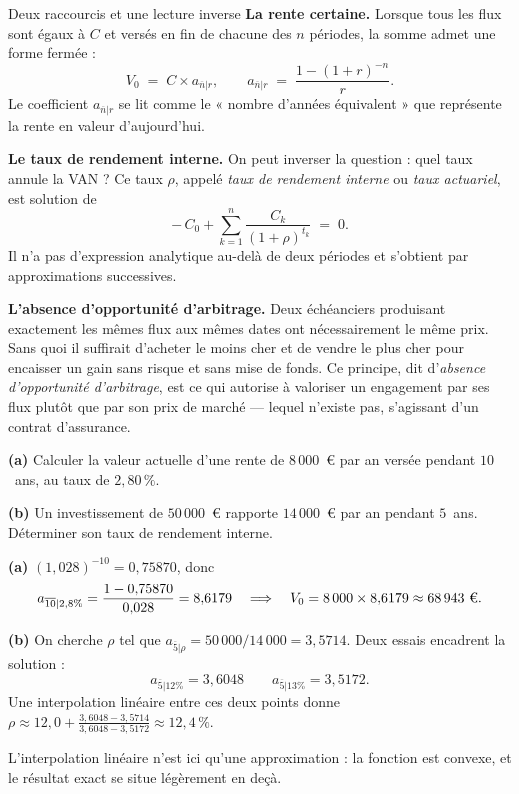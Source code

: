 \begin{generalisation}{Deux raccourcis et une lecture inverse}
\textbf{La rente certaine.} Lorsque tous les flux sont égaux à $C$ et versés en
fin de chacune des $n$ périodes, la somme admet une forme fermée :
\[
  V_0 \;=\; C \times a_{\overline{n}|r},
  \qquad
  a_{\overline{n}|r} \;=\; \frac{1-(1+r)^{-n}}{r}.
\]
Le coefficient $a_{\overline{n}|r}$ se lit comme le « nombre
d'années équivalent » que représente la rente en valeur d'aujourd'hui.

\medskip
\textbf{Le taux de rendement interne.} On peut inverser la question : quel taux
annule la VAN ? Ce taux $\rho$, appelé \emph{taux de rendement interne} ou
\emph{taux actuariel}, est solution de
\[
  -\,C_0 + \sum_{k=1}^{n} \frac{C_k}{(1+\rho)^{t_k}} \;=\; 0 .
\]
Il n'a pas d'expression analytique au-delà de deux périodes et s'obtient par
approximations successives.

\medskip
\textbf{L'absence d'opportunité d'arbitrage.} Deux échéanciers produisant
exactement les mêmes flux aux mêmes dates ont nécessairement le même prix. Sans
quoi il suffirait d'acheter le moins cher et de vendre le plus cher pour
encaisser un gain sans risque et sans mise de fonds. Ce principe, dit
d'\emph{absence d'opportunité d'arbitrage},
est ce qui autorise à valoriser un engagement par ses flux plutôt que par son
prix de marché --- lequel n'existe pas, s'agissant d'un contrat d'assurance.
\end{generalisation}

\begin{exercice}
\textbf{(a)} Calculer la valeur actuelle d'une rente de $8\,000$~\euro{} par an
versée pendant $10$~ans, au taux de $2{,}80\,\%$.

\medskip
\textbf{(b)} Un investissement de $50\,000$~\euro{} rapporte $14\,000$~\euro{}
par an pendant $5$~ans. Déterminer son taux de rendement interne.
\end{exercice}

\begin{corrige}
\textbf{(a)} $(1{,}028)^{-10} = 0{,}75870$, donc
\[
  a_{\overline{10}|2{,}8\%} = \frac{1-0{,}75870}{0{,}028} = 8{,}6179
  \quad\Longrightarrow\quad
  V_0 = 8\,000 \times 8{,}6179 \approx 68\,943\ \text{\euro}.
\]

\medskip
\textbf{(b)} On cherche $\rho$ tel que $a_{\overline{5}|\rho} = 50\,000/14\,000 = 3{,}5714$.
Deux essais encadrent la solution :
\[
  a_{\overline{5}|12\%} = 3{,}6048
  \qquad
  a_{\overline{5}|13\%} = 3{,}5172 .
\]
Une interpolation linéaire entre ces deux points donne
$\rho \approx 12{,}0 + \frac{3{,}6048-3{,}5714}{3{,}6048-3{,}5172} \approx 12{,}4\,\%$.

L'interpolation linéaire n'est ici qu'une approximation : la fonction est
convexe, et le résultat exact se situe légèrement en deçà.
\end{corrige}

